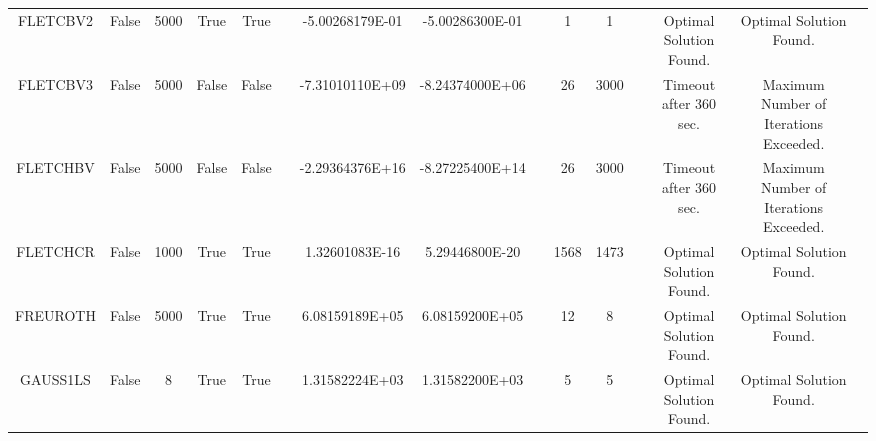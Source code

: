 \begin{longtable}{ccccccccccccccc}
	\cellcolor{default2} FLETCBV2& \cellcolor{default2} False& \cellcolor{default2} 5000& \cellcolor{default2} True& \cellcolor{default2} True& \cellcolor{header} & \cellcolor{ok} -5.00268179E-01& \cellcolor{best} -5.00286300E-01& \cellcolor{header} & \cellcolor{best} 1& \cellcolor{best} 1& \cellcolor{header} & \cellcolor{default2} Optimal Solution Found.& \cellcolor{default2} Optimal Solution Found.& \cellcolor{header} \\
	\cellcolor{default1} FLETCBV3& \cellcolor{default1} False& \cellcolor{default1} 5000& \cellcolor{default1} False& \cellcolor{default1} False& \cellcolor{header} & \cellcolor{best} -7.31010110E+09& \cellcolor{poor} -8.24374000E+06& \cellcolor{header} & \cellcolor{best} 26& \cellcolor{poor} 3000& \cellcolor{header} & \cellcolor{default1} Timeout after 360 sec.& \cellcolor{default1} Maximum Number of Iterations Exceeded.& \cellcolor{header} \\
	\cellcolor{default2} FLETCHBV& \cellcolor{default2} False& \cellcolor{default2} 5000& \cellcolor{default2} False& \cellcolor{default2} False& \cellcolor{header} & \cellcolor{best} -2.29364376E+16& \cellcolor{poor} -8.27225400E+14& \cellcolor{header} & \cellcolor{best} 26& \cellcolor{poor} 3000& \cellcolor{header} & \cellcolor{default2} Timeout after 360 sec.& \cellcolor{default2} Maximum Number of Iterations Exceeded.& \cellcolor{header} \\
	\cellcolor{default1} FLETCHCR& \cellcolor{default1} False& \cellcolor{default1} 1000& \cellcolor{default1} True& \cellcolor{default1} True& \cellcolor{header} & \cellcolor{ok} 1.32601083E-16& \cellcolor{best} 5.29446800E-20& \cellcolor{header} & \cellcolor{ok} 1568& \cellcolor{best} 1473& \cellcolor{header} & \cellcolor{default1} Optimal Solution Found.& \cellcolor{default1} Optimal Solution Found.& \cellcolor{header} \\
	\cellcolor{default2} FREUROTH& \cellcolor{default2} False& \cellcolor{default2} 5000& \cellcolor{default2} True& \cellcolor{default2} True& \cellcolor{header} & \cellcolor{best} 6.08159189E+05& \cellcolor{ok} 6.08159200E+05& \cellcolor{header} & \cellcolor{ok} 12& \cellcolor{best} 8& \cellcolor{header} & \cellcolor{default2} Optimal Solution Found.& \cellcolor{default2} Optimal Solution Found.& \cellcolor{header} \\
	\cellcolor{default1} GAUSS1LS& \cellcolor{default1} False& \cellcolor{default1} 8& \cellcolor{default1} True& \cellcolor{default1} True& \cellcolor{header} & \cellcolor{ok} 1.31582224E+03& \cellcolor{best} 1.31582200E+03& \cellcolor{header} & \cellcolor{best} 5& \cellcolor{best} 5& \cellcolor{header} & \cellcolor{default1} Optimal Solution Found.& \cellcolor{default1} Optimal Solution Found.& \cellcolor{header} \\

\end{longtable}
